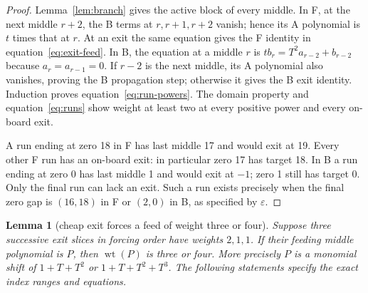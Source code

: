 \documentclass{article}
\newtheorem{lemma}{Lemma}
\DeclareMathOperator{\wt}{wt}
\begin{document}
\begin{proof}
  Lemma~\ref{lem:branch} gives the active block of every middle. In F, at the next middle
  \(r + 2\), the B terms at \(r, r + 1, r + 2\) vanish; hence its A polynomial is \(t\) times
  that at \(r\). At an exit the same equation gives the F identity in
  equation~\eqref{eq:exit-feed}. In B, the equation at a middle \(r\) is
  \(t b_r = T^2 a_{r-2} + b_{r-2}\) because \(a_r = a_{r-1} = 0\). If \(r - 2\) is the next
  middle, its A polynomial also vanishes, proving the B propagation step; otherwise it gives
  the B exit identity. Induction proves equation~\eqref{eq:run-powers}. The domain property and
  equation~\eqref{eq:runs} show weight at least two at every positive power and every on-board
  exit.

  A run ending at zero 18 in F has last middle 17 and would exit at 19. Every other F run has
  an on-board exit: in particular zero 17 has target 18. In B a run ending at zero 0 has last
  middle 1 and would exit at \(-1\); zero 1 still has target 0. Only the final run can lack an
  exit. Such a run exists precisely when the final zero gap is \((16,18)\) in F or \((2,0)\)
  in B, as specified by \(\varepsilon\).
\end{proof}

\begin{lemma}[cheap exit forces a feed of weight three or four]\label{lem:cheap-exit}
  Suppose three successive exit slices in forcing order have weights \(2, 1, 1\). If their
  feeding middle polynomial is \(P\), then \(\wt(P)\) is three or four. More precisely \(P\)
  is a monomial shift of \(1 + T + T^2\) or \(1 + T + T^2 + T^3\). The following statements
  specify the exact index ranges and equations.
\end{lemma}
\end{document}
